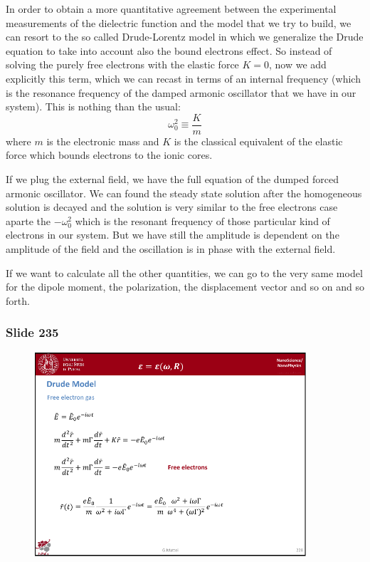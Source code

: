 \documentclass[../main/main.tex]{subfiles}
\begin{document}
In order to obtain a more quantitative agreement between the experimental measurements of the dielectric function and the model that we try to build, we can resort to the so called Drude-Lorentz model in which we generalize the Drude equation to take into account also the bound electrons effect. So instead of solving the purely free electrons with the elastic force \( K=0 \), now we add explicitly this term, which we can recast in terms of an internal frequency (which is the resonance frequency of the damped armonic oscillator that we have in our system). This is nothing than the usual:
\begin{equation*}
  \omega _0^2 \equiv \frac{K}{m}
\end{equation*}
where \( m  \) is the electronic mass and \( K \) is the classical equivalent of the elastic force which bounds electrons to the ionic cores.

If we plug the external field, we have the full equation of the dumped forced armonic oscillator. We can found the steady state solution after the homogeneous solution is decayed and the solution is very similar to the free electrons case aparte the \( - \omega _0^2 \) which is the resonant frequency of those particular kind of electrons in our system. But we have still the amplitude is dependent on the amplitude of the field and the oscillation is in phase with the external field.

If we want to calculate all the other quantities, we can go to the very same model for the dipole moment, the polarization, the displacement vector and so on and so forth.


\newpage

\subsubsection{Slide 235}

\begin{figure}[h!]
\centering
\includegraphics[page=8,width=0.9\textwidth]{../lessons/pdf_file/15_lesson.pdf}
\end{figure}
\end{document}
